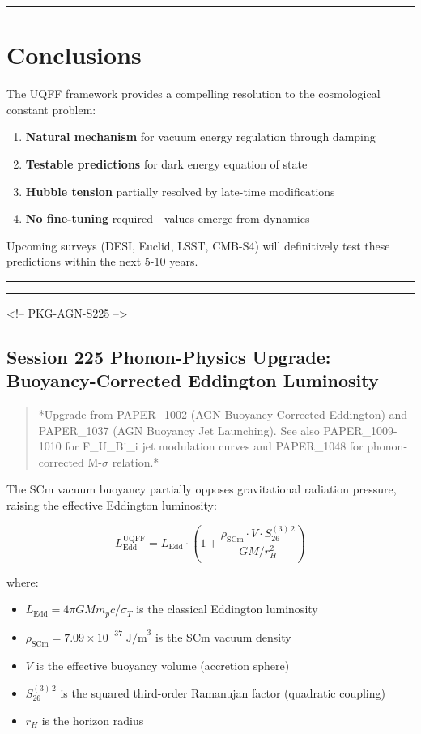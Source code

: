 \documentclass[12pt,a4paper]{article}
\begin{document}
\medskip\hrule\medskip

\section{Conclusions}

The UQFF framework provides a compelling resolution to the cosmological constant problem:

\begin{enumerate}
  \item \textbf{Natural mechanism} for vacuum energy regulation through damping
  \item \textbf{Testable predictions} for dark energy equation of state
  \item \textbf{Hubble tension} partially resolved by late-time modifications
  \item \textbf{No fine-tuning} required---values emerge from dynamics
\end{enumerate}

Upcoming surveys (DESI, Euclid, LSST, CMB-S4) will definitively test these predictions within the next 5-10 years.

\medskip\hrule\medskip

\medskip\hrule\medskip

<!-- PKG-AGN-S225 -->

\subsection{Session 225 Phonon-Physics Upgrade: Buoyancy-Corrected Eddington Luminosity}

\begin{quote}
*Upgrade from PAPER\_1002 (AGN Buoyancy-Corrected Eddington) and PAPER\_1037
(AGN Buoyancy Jet Launching).  See also PAPER\_1009-1010 for F\_{U\_Bi\_i} jet
modulation curves and PAPER\_1048 for phonon-corrected M-$\sigma$ relation.*
\end{quote}

The SCm vacuum buoyancy partially opposes gravitational radiation pressure, raising the effective Eddington luminosity:

\begin{equation}
L_{\text{Edd}}^{\text{UQFF}} = L_{\text{Edd}} \cdot \left(1 + \frac{\rho_{\text{SCm}} \cdot V \cdot S_{26}^{(3)\,2}}{G M / r_H^2}\right)
\end{equation}

where:

\begin{itemize}
  \item $L_{\text{Edd}} = 4\pi G M m_p c / \sigma_T$ is the classical Eddington luminosity
  \item $\rho_{\text{SCm}} = 7.09 \times 10^{-37}\;\text{J/m}^3$ is the SCm vacuum density
  \item $V$ is the effective buoyancy volume (accretion sphere)
  \item $S_{26}^{(3)\,2}$ is the squared third-order Ramanujan factor (quadratic coupling)
  \item $r_H$ is the horizon radius
\end{itemize}
\end{document}
